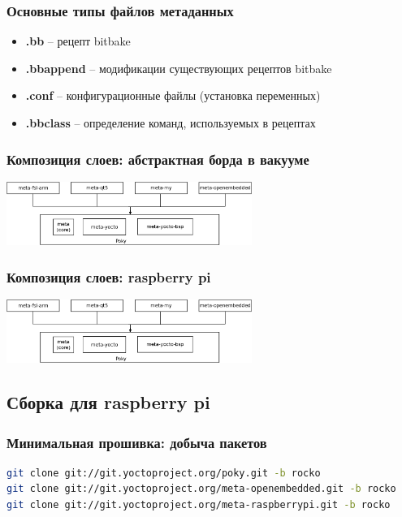 \begin{frame}
  \frametitle{Основные типы файлов метаданных}
  \begin{itemize}
    \item \textbf{.bb} -- рецепт bitbake 
    \item \textbf{.bbappend} -- модификации существующих рецептов bitbake 
    \item \textbf{.conf} -- конфигурационные файлы (установка переменных)
    \item \textbf{.bbclass} -- определение команд, используемых в рецептах 
  \end{itemize}
\end{frame}

\begin{frame}
  \frametitle{Композиция слоев: абстрактная борда в вакууме}
  \includegraphics[width=8cm]{yocto-basic-meta.png}
\end{frame}

\begin{frame}
  \frametitle{Композиция слоев: raspberry pi}
  \includegraphics[width=8cm]{yocto-basic-meta.png}
\end{frame}

\subsection{Сборка для raspberry pi}
\begin{frame}[fragile]
  \frametitle{Минимальная прошивка: добыча пакетов}
\begin{lstlisting}[language=bash]
git clone git://git.yoctoproject.org/poky.git -b rocko
git clone git://git.yoctoproject.org/meta-openembedded.git -b rocko
git clone git://git.yoctoproject.org/meta-raspberrypi.git -b rocko
\end{lstlisting}
\end{frame}

